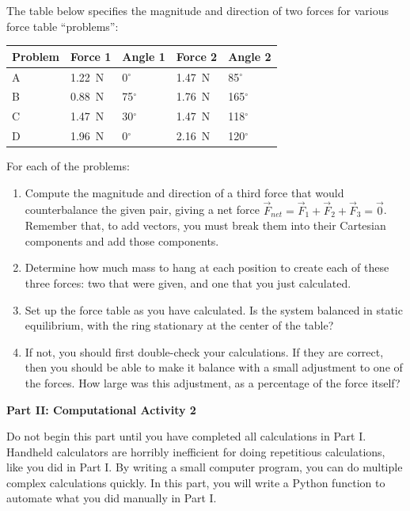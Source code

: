 \documentclass[11pt]{article}
\begin{document}
\small

The table below specifies the magnitude and direction of two forces for
various force table ``problems'':

\begin{center}
\begin{tabular}{l|ll|ll}
\hline
Problem & Force 1 & Angle 1 & Force 2 & Angle 2 \\
\hline
A & 1.22~N  & 0$^\circ$ & 1.47~N & 85$^\circ$ \\
B & 0.88~N & 75$^\circ$ & 1.76~N & 165$^\circ$ \\
C & 1.47~N & 30$^\circ$ & 1.47~N & 118$^\circ$ \\
D & 1.96~N & 0$^\circ$ & 2.16~N & 120$^\circ$ \\
\hline
\end{tabular}
\end{center}




\noindent For each of the problems:
\begin{enumerate}
\item Compute the magnitude and direction of a third force that would 
counterbalance the given pair, giving a net force
${\vec F}_{net} = {\vec F}_1 + {\vec F}_2 + {\vec F}_3 = \vec 0$.
Remember that, to add vectors, you must break them into their Cartesian
components and add those components.
\item Determine how much mass to hang at each position 
 to create each of these three forces: two that were given, and one that
 you just calculated.
\item Set up the force table as you have calculated.  Is the system balanced
  in static equilibrium, with the ring stationary at the center of the table?  
\item If not, you should first double-check your calculations.  If they are 
  correct, then you should be able to make it balance with a small 
  adjustment to one of the forces.  How large was this adjustment,
  as a percentage of the force itself?
\end{enumerate}  
\begin{center}
\textbf{Part II: Computational Activity 2}
\end{center}
Do not begin this part until you have completed all calculations in Part I. Handheld calculators are horribly inefficient for doing repetitious calculations, like you did in Part I. By writing a small computer program, you can do multiple complex calculations quickly. In this part, you will write a Python function to automate what you did manually in Part I.
\end{document}
